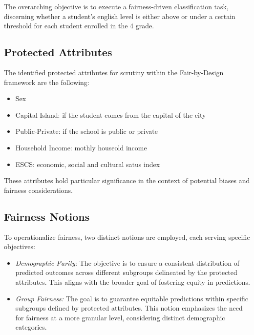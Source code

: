 The overarching objective is to execute a fairness-driven classification task, discerning whether a student's english level is either above or under a certain threshold for each student enrolled in the 4 grade.

\subsection{Protected Attributes}

The identified protected attributes for scrutiny within the Fair-by-Design framework are the following:

\begin{itemize}

    \item Sex

    \item Capital Island: if the student comes from the capital of the city

    \item Public-Private: if the school is public or private
    
    \item Household Income: mothly houseold income

    \item ESCS: economic, social and cultural satus index

\end{itemize}

These attributes hold particular significance in the context of potential biases and fairness considerations.

\subsection{Fairness Notions}

To operationalize fairness, two distinct notions are employed, each serving specific objectives:

\begin{itemize}
    \item \emph{Demographic Parity:} The objective is to ensure a consistent distribution of predicted outcomes across different subgroups delineated by the protected attributes. This aligns with the broader goal of fostering equity in predictions.

    \item \emph{Group Fairness:} The goal is to guarantee equitable predictions within specific subgroups defined by protected attributes. This notion emphasizes the need for fairness at a more granular level, considering distinct demographic categories.
\end{itemize}

